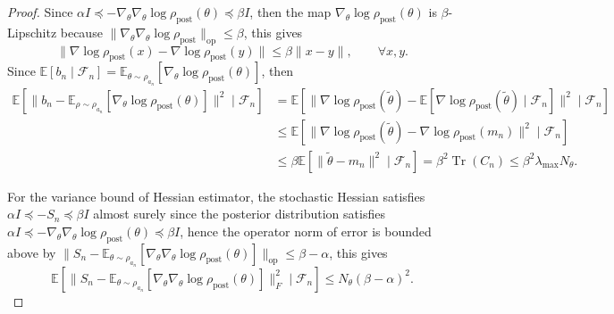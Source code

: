 \documentclass[11pt]{article}
\theoremstyle{plain}
\theoremstyle{definition}
\theoremstyle{remark}
\newcommand{\Tr}{\operatorname{Tr}}
\begin{document}
\begin{proof}
    Since $\alpha I \preceq - \nabla_\theta \nabla_\theta \log \rho_\mathrm{post} (\theta) \preceq \beta I$, then the map $\nabla_\theta \log \rho_\mathrm{post} (\theta)$ is $\beta$-Lipschitz because $\| \nabla_\theta \nabla_\theta \log \rho_\mathrm{post} \|_\mathrm{op} \leq \beta$, this gives
    \begin{equation*}
        \| \nabla \log \rho_\mathrm{post} (x) - \nabla \log \rho_\mathrm{post} (y) \| \leq \beta \|x - y\|, \qquad \forall x, y.
    \end{equation*}
    Since $\mathbb{E}[b_n \mid \mathcal{F}_n] = \mathbb{E}_{\theta \sim \rho_{a_n}} [\nabla_\theta \log \rho_\mathrm{post} (\theta)]$, then
    \begin{align*}
        \mathbb{E}[\| b_n - \mathbb{E}_{\rho \sim \rho_{a_n}} [\nabla_\theta \log \rho_\mathrm{post} (\theta)] \|^2 \mid \mathcal{F}_n] &= \mathbb{E} [\| \nabla \log \rho_\mathrm{post} (\tilde \theta) - \mathbb{E} [\nabla \log \rho_\mathrm{post} (\tilde\theta) \mid \mathcal{F}_n] \|^2 \mid \mathcal{F}_n] \\
        &\leq \mathbb{E} [\| \nabla \log \rho_\mathrm{post} (\tilde \theta) - \nabla \log \rho_\mathrm{post} (m_n) \|^2 \mid \mathcal{F}_n] \\
        &\leq \beta \mathbb{E} [\| \tilde\theta - m_n \|^2 \mid \mathcal{F}_n] = \beta^2 \Tr (C_n) \leq \beta^2 \lambda_{\max} N_\theta.
    \end{align*}

    For the variance bound of Hessian estimator, the stochastic Hessian satisfies $\alpha I \preceq -S_n \preceq \beta I$ almost surely since the posterior distribution satisfies $\alpha I \preceq -\nabla_\theta \nabla_\theta \log \rho_\mathrm{post} (\theta) \preceq \beta I$, hence the operator norm of error is bounded above by $\| S_n - \mathbb{E}_{\theta \sim \rho_{a_n}} [\nabla_\theta \nabla_\theta \log \rho_\mathrm{post} (\theta)] \|_\mathrm{op} \leq \beta - \alpha$, this gives
    \begin{equation*}
        \mathbb{E} [\| S_n - \mathbb{E}_{\theta \sim \rho_{a_n}} [\nabla_\theta \nabla_\theta \log \rho_\mathrm{post} (\theta)] \|_F^2 \mid \mathcal{F}_n] \leq N_\theta (\beta - \alpha)^2.
    \end{equation*}
\end{proof}
\end{document}
